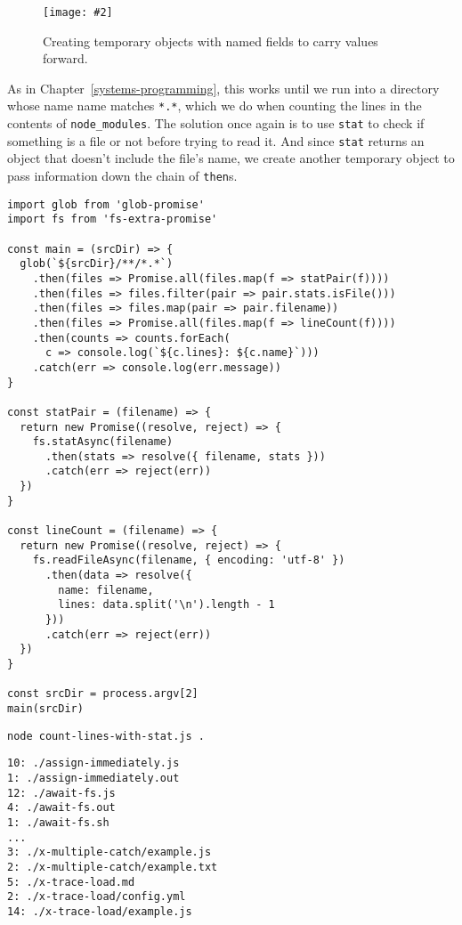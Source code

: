 \documentclass[krantzl]{krantz}
\newcommand{\figpdf}[4]{\begin{figure}%
\centering%
\texttt{[image: \#2]}%
\caption{#3}%
\label{#1}%
\end{figure}}
\newcommand{\chapref}[1]{Chapter~\ref{#1}}
\begin{document}
\figpdf{async-programming-temporary-named-fields}{./async-programming/temporary-named-fields.pdf}{Creating temporary objects with named fields to carry values forward.}{0.6}


As in \chapref{systems-programming},
this works until we run into a directory whose name name matches \texttt{*.*},
which we do when counting the lines in the contents of \texttt{node\_modules}.
The solution once again is to use \texttt{stat} to check if something is a file or not
before trying to read it.
And since \texttt{stat} returns an object that doesn’t include the file’s name,
we create another temporary object to pass information down the chain of \texttt{then}s.


\begin{lstlisting}[frame=tblr]
import glob from 'glob-promise'
import fs from 'fs-extra-promise'

const main = (srcDir) => {
  glob(`${srcDir}/**/*.*`)
    .then(files => Promise.all(files.map(f => statPair(f))))
    .then(files => files.filter(pair => pair.stats.isFile()))
    .then(files => files.map(pair => pair.filename))
    .then(files => Promise.all(files.map(f => lineCount(f))))
    .then(counts => counts.forEach(
      c => console.log(`${c.lines}: ${c.name}`)))
    .catch(err => console.log(err.message))
}

const statPair = (filename) => {
  return new Promise((resolve, reject) => {
    fs.statAsync(filename)
      .then(stats => resolve({ filename, stats }))
      .catch(err => reject(err))
  })
}

const lineCount = (filename) => {
  return new Promise((resolve, reject) => {
    fs.readFileAsync(filename, { encoding: 'utf-8' })
      .then(data => resolve({
        name: filename,
        lines: data.split('\n').length - 1
      }))
      .catch(err => reject(err))
  })
}

const srcDir = process.argv[2]
main(srcDir)
\end{lstlisting}



\begin{lstlisting}[frame=shadowbox]
node count-lines-with-stat.js .
\end{lstlisting}



\begin{lstlisting}[frame=tblr,backgroundcolor=\color{black!5}]
10: ./assign-immediately.js
1: ./assign-immediately.out
12: ./await-fs.js
4: ./await-fs.out
1: ./await-fs.sh
...
3: ./x-multiple-catch/example.js
2: ./x-multiple-catch/example.txt
5: ./x-trace-load.md
2: ./x-trace-load/config.yml
14: ./x-trace-load/example.js
\end{lstlisting}
\end{document}
